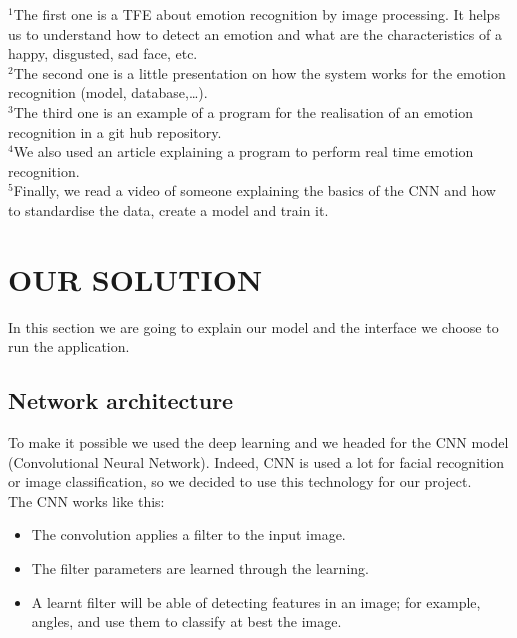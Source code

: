 \documentclass[a4paper, 10pt, conference]{ieeeconf}      %
\begin{document}
\normalsize
$^1$The first one is a TFE about emotion recognition by image processing. It helps us to understand how to detect an emotion and what are the characteristics of a happy, disgusted, sad face, etc.\\

$^2$The second one is a little presentation on how the system works for the emotion recognition (model, database,…).\\

$^3$The third one is an example of a program for the realisation of an emotion recognition in a git hub repository.\\

$^4$We also used an article explaining a program to perform real time emotion recognition.\\

$^5$Finally, we read a video of someone explaining the basics of the CNN and how to standardise the data, create a model and train it.

\addtolength{\textheight}{-3cm}   %

\section{OUR SOLUTION}
In this section we are going to explain our model and the interface we choose to run the application.

\subsection{Network architecture}
To make it possible we used the deep learning and we headed for the CNN model (Convolutional Neural Network).
Indeed, CNN is used a lot for facial recognition or image classification, so we decided to use this technology for our project.\\
The CNN works like this:
\begin{itemize}
\item The convolution applies a filter to the input image.
\item The filter parameters are learned through the learning.
\item A learnt filter will be able of detecting features in an image; for example, angles, and use them to classify at best the image.
\end{itemize}
\end{document}
